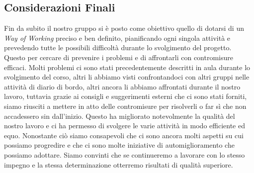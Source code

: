 \documentclass{article}
\begin{document}
\subsection{Considerazioni Finali}
Fin da subito il nostro gruppo si è posto come obiettivo quello di dotarsi di un \textit{Way of Working} preciso e ben definito, pianificando ogni singola attività e prevedendo tutte le possibili difficoltà durante lo svolgimento del progetto.
Questo per cercare di prevenire i problemi e di affrontarli con contromisure efficaci. Molti problemi ci sono stati precedentemente descritti in aula durante lo svolgimento del corso, altri li abbiamo visti confrontandoci con altri gruppi nelle attività di diario di bordo,
altri ancora li abbiamo affrontati durante il nostro lavoro, tuttavia grazie ai consigli e suggerimenti esterni che ci sono stati forniti, siamo riusciti a mettere in atto delle contromisure per risolverli o far sì che non accadessero sin dall'inizio.
Questo ha migliorato notevolmente la qualità del nostro lavoro e ci ha permesso di svolgere le varie attività in modo efficiente ed equo. Nonostante ciò siamo consapevoli che ci sono ancora molti aspetti su cui possiamo progredire e che ci sono molte iniziative di automiglioramento che possiamo adottare.
Siamo convinti che se continueremo a lavorare con lo stesso impegno e la stessa determinazione otterremo risultati di qualità superiore.
\end{document}
